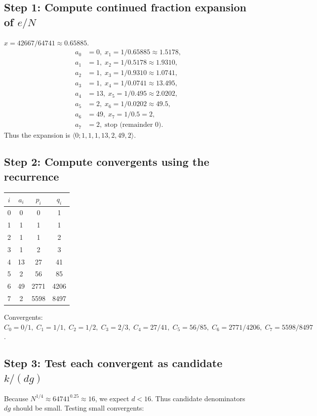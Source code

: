 \subsection*{Step 1: Compute continued fraction expansion of \(e/N\)}
\(x = 42667 / 64741 \approx 0.65885\).
\begin{align*}
a_0 &= 0,\; x_1 = 1/0.65885 \approx 1.5178,\\
a_1 &= 1,\; x_2 = 1/0.5178 \approx 1.9310,\\
a_2 &= 1,\; x_3 = 1/0.9310 \approx 1.0741,\\
a_3 &= 1,\; x_4 = 1/0.0741 \approx 13.495,\\
a_4 &= 13,\; x_5 = 1/0.495 \approx 2.0202,\\
a_5 &= 2,\; x_6 = 1/0.0202 \approx 49.5,\\
a_6 &= 49,\; x_7 = 1/0.5 = 2,\\
a_7 &= 2,\; \text{stop (remainder 0)}.
\end{align*}
Thus the expansion is \(\langle 0;1,1,1,13,2,49,2\rangle\).

\subsection*{Step 2: Compute convergents using the recurrence}

\begin{table}[htbp]
\centering
\label{tab:convergents}
\begin{tabular}{c|ccc}
\toprule
$i$ & $a_i$ & $p_i$ & $q_i$ \\
\midrule
0 & 0 & 0   & 1   \\
1 & 1 & 1   & 1   \\
2 & 1 & 1   & 2   \\
3 & 1 & 2   & 3   \\
4 & 13& 27  & 41  \\
5 & 2 & 56  & 85  \\
6 & 49& 2771& 4206\\
7 & 2 & 5598& 8497\\
\bottomrule
\end{tabular}
\end{table}
Convergents:
\(C_0 = 0/1,\; C_1 = 1/1,\; C_2 = 1/2,\; C_3 = 2/3,\; C_4 = 27/41,\; C_5 = 56/85,\; C_6 = 2771/4206,\; C_7 = 5598/8497\).

\subsection*{Step 3: Test each convergent as candidate \(k/(dg)\)}
Because \(N^{1/4} \approx 64741^{0.25} \approx 16\), we expect \(d < 16\). Thus candidate denominators \(dg\) should be small. Testing small convergents:


